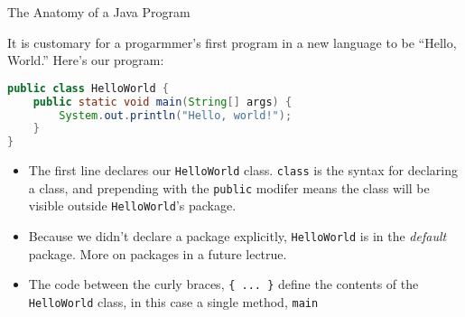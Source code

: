 \documentclass{beamer}
\begin{document}
\begin{frame}
  \titlepage
\end{frame}

\begin{frame}[fragile]{The Anatomy of a Java Program}


It is customary for a progarmmer's first program in a new language to be ``Hello, World.''  Here's our  program:
\begin{lstlisting}[language=Java]
public class HelloWorld {
    public static void main(String[] args) {
        System.out.println("Hello, world!");
    }
}
\end{lstlisting}
\vspace{-.1in}
\begin{itemize}
\item The first line declares our {\tt HelloWorld} class.  {\tt class} is the syntax for declaring a class, and prepending with the {\tt public} modifer means the class will be visible outside {\tt HelloWorld}'s package.
\item Because we didn't declare a package explicitly, {\tt HelloWorld} is in the {\it default} package.  More on packages in a future lectrue.
\item The code between the curly braces, {\tt \{ ... \}} define the contents of the {\tt HelloWorld} class, in this case a single method, {\tt main}
\end{itemize}

\end{frame}
\end{document}
